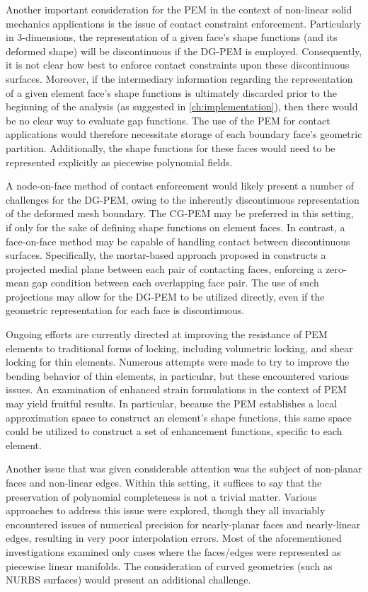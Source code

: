 Another important consideration for the PEM in the context of non-linear solid mechanics applications is the issue of contact constraint enforcement. Particularly in 3-dimensions, the representation of a given face's shape functions (and its deformed shape) will be discontinuous if the DG-PEM is employed. Consequently, it is not clear how best to enforce contact constraints upon these discontinuous surfaces. Moreover, if the intermediary information regarding the representation of a given element face's shape functions is ultimately discarded prior to the beginning of the analysis (as suggested in \ref{ch:implementation}), then there would be no clear way to evaluate gap functions. The use of the PEM for contact applications would therefore necessitate storage of each boundary face's geometric partition. Additionally, the shape functions for these faces would need to be represented explicitly as piecewise polynomial fields.

A node-on-face method of contact enforcement would likely present a number of challenges for the DG-PEM, owing to the inherently discontinuous representation of the deformed mesh boundary. The CG-PEM may be preferred in this setting, if only for the sake of defining shape functions on element faces. In contrast, a face-on-face method may be capable of handling contact between discontinuous surfaces. Specifically, the mortar-based approach proposed in \cite{Wopschall:17} constructs a projected medial plane between each pair of contacting faces, enforcing a zero-mean gap condition between each overlapping face pair. The use of such projections may allow for the DG-PEM to be utilized directly, even if the geometric representation for each face is discontinuous.

Ongoing efforts are currently directed at improving the resistance of PEM elements to traditional forms of locking, including volumetric locking, and shear locking for thin elements. Numerous attempts were made to try to improve the bending behavior of thin elements, in particular, but these encountered various issues. An examination of enhanced strain formulations in the context of PEM may yield fruitful results. In particular, because the PEM establishes a local approximation space to construct an element's shape functions, this same space could be utilized to construct a set of enhancement functions, specific to each element.

Another issue that was given considerable attention was the subject of non-planar faces and non-linear edges. Within this setting, it suffices to say that the preservation of polynomial completeness is not a trivial matter. Various approaches to address this issue were explored, though they all invariably encountered issues of numerical precision for nearly-planar faces and nearly-linear edges, resulting in very poor interpolation errors. Most of the aforementioned investigations examined only cases where the faces/edges were represented as piecewise linear manifolds. The consideration of curved geometries (such as NURBS surfaces) would present an additional challenge.

